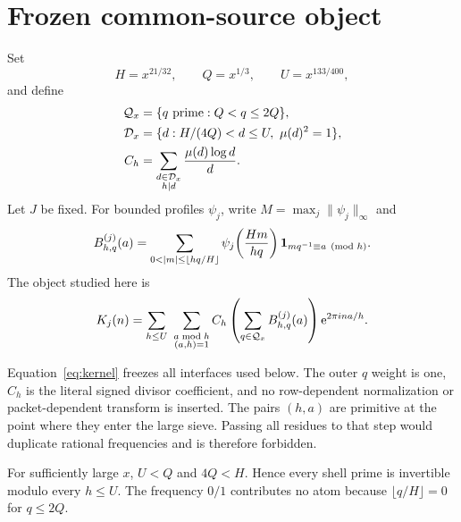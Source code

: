 \section{Frozen common-source object}

Set
\begin{equation}
 H=x^{21/32},\qquad Q=x^{1/3},\qquad
 U=x^{133/400},                                      \label{eq:scales}
\end{equation}
and define
\begin{align}
 \mathcal Q_x&=\{q\text{ prime}:Q<q\le2Q\},\\
 \mathcal D_x&=\{d:H/(4Q)<d\le U,\ \mu(d)^2=1\},\\
 C_h&=\sum_{\substack{d\in\mathcal D_x\\h\mid d}}
       \frac{\mu(d)\log d}{d}.                       \label{eq:Ch}
\end{align}
Let $J$ be fixed.  For bounded profiles $\psi_j$, write
$M=\max_j\|\psi_j\|_\infty$ and
\begin{equation}
 B_{h,q}^{(j)}(a)=
 \sum_{0<|m|\le\lfloor hq/H\rfloor}
 \psi_j\!\left(\frac{Hm}{hq}\right)
 \one_{m q^{-1}\equiv a\pmod h}.                    \label{eq:row}
\end{equation}
The object studied here is
\begin{equation}
 K_j(n)=
 \sum_{h\le U}\ \sum_{\substack{a\bmod h\\(a,h)=1}}
 C_h\left(\sum_{q\in\mathcal Q_x}B_{h,q}^{(j)}(a)\right)
 \mathrm e^{2\pi i n a/h}.                                 \label{eq:kernel}
\end{equation}

Equation~\eqref{eq:kernel} freezes all interfaces used below.  The outer $q$ weight
is one, $C_h$ is the literal signed divisor coefficient, and no row-dependent
normalization or packet-dependent transform is inserted.  The pairs $(h,a)$ are
primitive at the point where they enter the large sieve.  Passing all residues to
that step would duplicate rational frequencies and is therefore forbidden.

For sufficiently large $x$, $U<Q$ and $4Q<H$.  Hence every shell prime is invertible
modulo every $h\le U$.  The frequency $0/1$ contributes no atom because
$\lfloor q/H\rfloor=0$ for $q\le2Q$.
